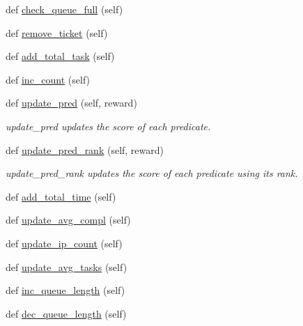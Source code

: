 \begin{DoxyCompactItemize}
\item 
def \mbox{\hyperlink{classdynamicfilterapp_1_1models_1_1_predicate_a5e4bd5c707fd3d9a4b5a729afea6ab95}{check\+\_\+queue\+\_\+full}} (self)
\item 
def \mbox{\hyperlink{classdynamicfilterapp_1_1models_1_1_predicate_aa50b82ab39c996d4b89694655057ab8e}{remove\+\_\+ticket}} (self)
\item 
def \mbox{\hyperlink{classdynamicfilterapp_1_1models_1_1_predicate_abc989a62ab5e42f27e19abb3f0744d0d}{add\+\_\+total\+\_\+task}} (self)
\item 
def \mbox{\hyperlink{classdynamicfilterapp_1_1models_1_1_predicate_abe39cd365c5c5fe81f91f66e1a331599}{inc\+\_\+count}} (self)
\item 
def \mbox{\hyperlink{classdynamicfilterapp_1_1models_1_1_predicate_a10d89924e071640aee4eedd86662e505}{update\+\_\+pred}} (self, reward)
\begin{DoxyCompactList}\small\item\em update\+\_\+pred updates the score of each predicate. \end{DoxyCompactList}\item 
def \mbox{\hyperlink{classdynamicfilterapp_1_1models_1_1_predicate_a8945ec4943839cc7dc37954ae33e2397}{update\+\_\+pred\+\_\+rank}} (self, reward)
\begin{DoxyCompactList}\small\item\em update\+\_\+pred\+\_\+rank updates the score of each predicate using its rank. \end{DoxyCompactList}\item 
def \mbox{\hyperlink{classdynamicfilterapp_1_1models_1_1_predicate_a5d9324dd67dcaae3edb112d23c33a9d8}{add\+\_\+total\+\_\+time}} (self)
\item 
def \mbox{\hyperlink{classdynamicfilterapp_1_1models_1_1_predicate_a5d8c939a3e8f1815ac4768caea92ea9e}{update\+\_\+avg\+\_\+compl}} (self)
\item 
def \mbox{\hyperlink{classdynamicfilterapp_1_1models_1_1_predicate_af28772c782daf9e16362c89252e4c75c}{update\+\_\+ip\+\_\+count}} (self)
\item 
def \mbox{\hyperlink{classdynamicfilterapp_1_1models_1_1_predicate_a46ea5633155540e0474830a73ece68de}{update\+\_\+avg\+\_\+tasks}} (self)
\item 
def \mbox{\hyperlink{classdynamicfilterapp_1_1models_1_1_predicate_a6e8c8ca5961ded4fefad793206ed2612}{inc\+\_\+queue\+\_\+length}} (self)
\item 
def \mbox{\hyperlink{classdynamicfilterapp_1_1models_1_1_predicate_adf2c6e37d925945ace447e024b31b87e}{dec\+\_\+queue\+\_\+length}} (self)

\end{DoxyCompactItemize}
